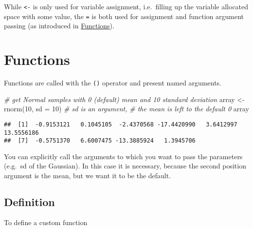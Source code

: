 \documentclass[
  oneside]{book}
\newenvironment{Shaded}{\begin{snugshade}}{\end{snugshade}}
\newcommand{\AttributeTok}[1]{\textcolor[rgb]{0.77,0.63,0.00}{#1}}
\newcommand{\CommentTok}[1]{\textcolor[rgb]{0.56,0.35,0.01}{\textit{#1}}}
\newcommand{\DecValTok}[1]{\textcolor[rgb]{0.00,0.00,0.81}{#1}}
\newcommand{\FunctionTok}[1]{\textcolor[rgb]{0.00,0.00,0.00}{#1}}
\newcommand{\NormalTok}[1]{#1}
\newcommand{\OtherTok}[1]{\textcolor[rgb]{0.56,0.35,0.01}{#1}}
\begin{document}
While \texttt{\textless{}-} is only used for variable assignment, i.e.~filling up the variable
allocated space with some value, the \texttt{=} is both used for assignment and
function argument passing (as introduced in \protect\hyperlink{functions}{Functions}).

\hypertarget{functions}{%
\section{Functions}\label{functions}}

Functions are called with the \texttt{()} operator and present named arguments.

\begin{Shaded}
\begin{Highlighting}[]
\CommentTok{\# get Normal samples with 0 (default) mean and 10 standard deviation}
\NormalTok{array }\OtherTok{\textless{}{-}} \FunctionTok{rnorm}\NormalTok{(}\DecValTok{10}\NormalTok{, }\AttributeTok{sd =} \DecValTok{10}\NormalTok{) }\CommentTok{\# sd is an argument,}
                            \CommentTok{\# the mean is left to the default 0}
\NormalTok{array}
\end{Highlighting}
\end{Shaded}

\begin{verbatim}
##  [1]  -0.9153121   0.1045105  -2.4370568 -17.4420990   3.6412997  13.5556186
##  [7]  -0.5751370   6.6007475 -13.3885924   1.3945706
\end{verbatim}

You can explicitly call the arguments to which you want to pass the parameters
(e.g.~sd of the Gaussian). In this case it is necessary, because the second
position argument is the mean, but we want it to be the default.

\hypertarget{definition}{%
\subsection{Definition}\label{definition}}

To define a custom function
\end{document}
